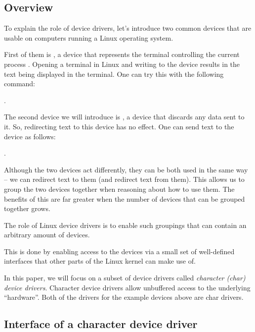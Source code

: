 \documentclass[..thesis.tex]{subfiles}
\begin{document}
\subsection{Overview}



To explain the role of device drivers, let's introduce two common devices that are usable on computers running a Linux operating system.

First of them is , a device that represents the terminal controlling the current process \cite{torvalds_linux}.
Opening a terminal in Linux and writing to the device results in the text being displayed in the terminal. One can try this with the following command: 

.
 
The second device we will introduce is , a device that discards any data sent to it. So, redirecting text to this device has no effect.
One can send text to the device as follows:

.

Although the two devices act differently, they can be both used in the same way -- we can redirect text to them (and redirect text from them).
This allows us to group the two devices together when reasoning about how to use them. The benefits of this are far greater when the number of devices that can be grouped together grows.

The role of Linux device drivers is to enable such groupings that can contain an arbitrary amount of devices.

This is done by enabling access to the devices via a small set of well-defined interfaces that other parts of the Linux kernel can make use of. 

In this paper, we will focus on a subset of device drivers called \textit{character (char) device drivers}.
Character device drivers allow unbuffered access to the underlying ``hardware''. Both of the drivers for the example devices above are char drivers.

\subsection{Interface of a character device driver}
\end{document}
